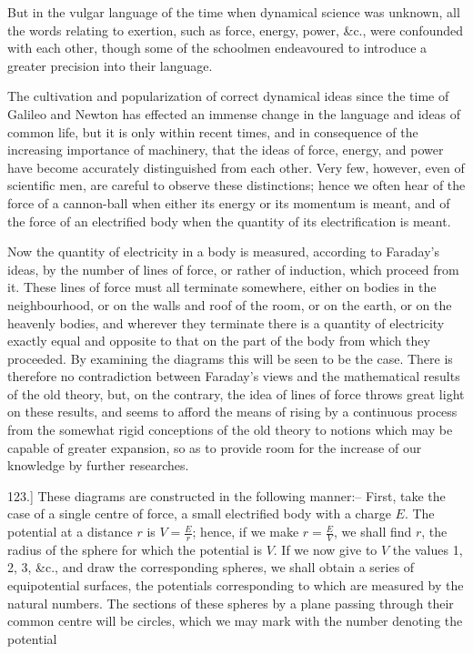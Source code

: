 \documentclass[11pt,a4paper]{article}
\begin{document}
But in the vulgar language of the time when dynamical science was unknown, all the words relating to exertion, such as force, energy, power, \&c., were confounded with each other, though some of the schoolmen endeavoured to introduce a greater precision into their language.

The cultivation and popularization of correct dynamical ideas since the time of Galileo and Newton has effected an immense change in the language and ideas of common life, but it is only within recent times, and in consequence of the increasing importance of machinery, that the ideas of force, energy, and power have become accurately distinguished from each other. Very few, however, even of scientific men, are careful to observe these distinctions; hence we often hear of the force of a cannon-ball when either its energy or its momentum is meant, and of the force of an electrified body when the quantity of its electrification is meant.

Now the quantity of electricity in a body is measured, according to Faraday's ideas, by the number of lines of force, or rather of induction, which proceed from it. These lines of force must all terminate somewhere, either on bodies in the neighbourhood, or on the walls and roof of the room, or on the earth, or on the heavenly bodies, and wherever they terminate there is a quantity of electricity exactly equal and opposite to that on the part of the body from which they proceeded. By examining the diagrams this will be seen to be the case. There is therefore no contradiction between Faraday's views and the mathematical results of the old theory, but, on the contrary, the idea of lines of force throws great light on these results, and seems to afford the means of rising by a continuous process from the somewhat rigid conceptions of the old theory to notions which may be capable of greater expansion, so as to provide room for the increase of our knowledge by further researches.

123.] These diagrams are constructed in the following manner:--
First, take the case of a single centre of force, a small electrified body with a charge $E$. The potential at a distance $r$ is $V=\frac{E}{r}$; hence, if we make $r=\frac{E}{V}$, we shall find $r$, the radius of the sphere for which the potential is $V$. If we now give to $V$ the values 1, 2, 3, \&c., and draw the corresponding spheres, we shall obtain a series of equipotential surfaces, the potentials corresponding to which are measured by the natural numbers. The sections of these spheres by a plane passing through their common centre will be circles, which we may mark with the number denoting the potential
\end{document}
